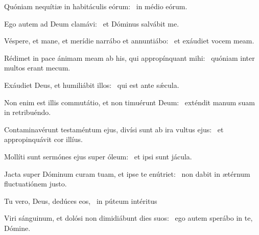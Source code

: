 \item Quóniam nequítiæ in habitáculis eórum:~\psstar{} in médio eórum.

\item Ego autem ad Deum clamávi:~\psstar{} et Dóminus salvábit me.

\item Véspere, et mane, et merídie narrábo et annuntiábo:~\psstar{} et exáudiet vocem meam.

\item Rédimet in pace ánimam meam ab his, qui appropínquant mihi:~\psstar{} quóniam inter multos erant mecum.

\item Exáudiet Deus, et humiliábit illos:~\psstar{} qui est ante sǽcula.

\item Non enim est illis commutátio, et non timuérunt Deum:~\psstar{} exténdit manum suam in retribuéndo.

\item Contaminavérunt testaméntum ejus, divísi sunt ab ira vultus ejus:~\psstar{} et appropinquávit cor illíus.

\item Mollíti sunt sermónes ejus super óleum:~\psstar{} et ipsi sunt jácula.

\item Jacta super Dóminum curam tuam, et ipse te enútriet:~\psstar{} non dabit in ætérnum fluctuatiónem justo.

\item Tu vero, Deus, dedúces eos,~\psstar{} in púteum intéritus

\item Viri sánguinum, et dolósi non dimidiábunt dies suos:~\psstar{} ego autem sperábo in te, Dómine.